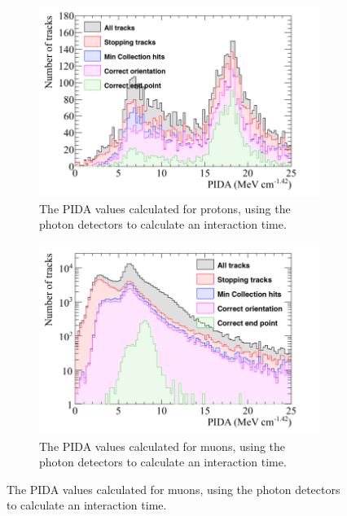 \begin{figure}
  \centering
  \begin{subfigure}{0.48\textwidth}
        \centering
        \includegraphics[width=\textwidth]{ProtonEnrich_500V_v05_14_00_trackpmtrackT0_Proton_PIDA}
        \caption{The PIDA values calculated for protons, using the photon detectors to calculate an interaction time.}
        \label{fig:CRY_PIDA_Proton_NonCheat}
  \end{subfigure}%
  \hspace{0.03\textwidth}%
  \begin{subfigure}{0.48\textwidth}
        \centering
        \includegraphics[width=\textwidth]{ProtonEnrich_500V_v05_14_00_trackpmtrackT0_Muon_PIDA}
        \caption{The PIDA values calculated for muons, using the photon detectors to calculate an interaction time.}
        \label{fig:CRY_PIDA_Muon_NonCheat}

\end{subfigure}
\end{figure}
